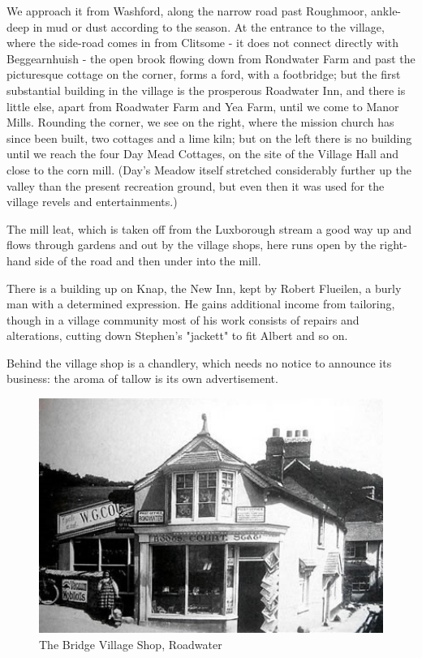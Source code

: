 We approach it from Washford, along the narrow road past Roughmoor, ankle-deep in mud or dust according to the season. At the entrance to the village, where the side-road comes in from Clitsome - it does not connect directly with Beggearnhuish - the open brook flowing down from Rondwater Farm and past the picturesque cottage on the corner, forms a ford, with a footbridge; but the first substantial building in the village is the prosperous Roadwater Inn, and there is little else, apart from Roadwater Farm and Yea Farm, until we come to Manor Mills. Rounding the corner, we see on the right, where the mission church has since been built, two cottages and a lime kiln; but on the left there is no building until we reach the four Day Mead Cottages, on the site of the Village Hall and close to the corn mill. (Day's Meadow itself stretched considerably further up the valley than the present recreation ground, but even then it was used for the village revels and entertainments.)

The mill leat, which is taken off from the Luxborough stream a good way up and flows through gardens and out by the village shops, here runs open by the right-hand side of the road and then under into the mill.

There is a building up on Knap, the New Inn, kept by Robert Flueilen, a burly man with a determined expression. He gains additional income from tailoring, though in a village community most of his work consists of repairs and alterations, cutting down Stephen's "jackett" to fit Albert and so on.

Behind the village shop is a chandlery, which needs no notice to announce its business: the aroma of tallow is its own advertisement.

\begin{figure}
     \includegraphics[width=1\textwidth]{figures/bridgeVillageShop}
     \caption{The Bridge Village Shop, Roadwater}
     \label{fig:BridgeShop}
\end{figure}

